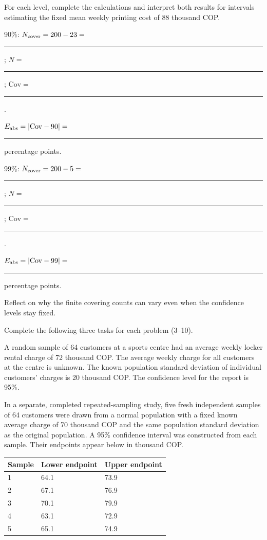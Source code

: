 \par For each level, complete the calculations and interpret both results for intervals estimating the fixed mean weekly printing cost of 88 thousand COP.
\par 90\%: $N_{\rm cover}=200-23=$ \rule{.5in}{.3pt}; $N=$ \rule{.4in}{.3pt}; $\mathrm{Cov}=$ \rule{1in}{.3pt}.
\par $E_{\rm abs}=|\mathrm{Cov}-90|=$ \rule{.7in}{.3pt} percentage points. 
\par 99\%: $N_{\rm cover}=200-5=$ \rule{.5in}{.3pt}; $N=$ \rule{.4in}{.3pt}; $\mathrm{Cov}=$ \rule{1in}{.3pt}.
\par $E_{\rm abs}=|\mathrm{Cov}-99|=$ \rule{.7in}{.3pt} percentage points. 
\par Reflect on why the finite covering counts can vary even when the confidence levels stay fixed.


Complete the following three tasks for each problem (3--10).


\noindent\begin{minipage}[t]{0.60\linewidth}
\vspace{0pt}
A random sample of 64 customers at a sports centre had an average weekly locker rental charge of 72 thousand COP. The average weekly charge for all customers at the centre is unknown. The known population standard deviation of individual customers' charges is 20 thousand COP. The confidence level for the report is 95\%.

In a separate, completed repeated-sampling study, five fresh independent samples of 64 customers were drawn from a normal population with a fixed known average charge of 70 thousand COP and the same population standard deviation as the original population. A 95\% confidence interval was constructed from each sample. Their endpoints appear below in thousand COP.
\end{minipage}\hfill
\begin{minipage}[t]{0.38\linewidth}
\vspace{0pt}
\centering
\small
\setlength{\tabcolsep}{4pt}
\begin{tabular}{@{}lll@{}}\toprule
Sample & Lower endpoint & Upper endpoint\\\midrule
1 & 64.1 & 73.9\\
2 & 67.1 & 76.9\\
3 & 70.1 & 79.9\\
4 & 63.1 & 72.9\\
5 & 65.1 & 74.9\\
\bottomrule\end{tabular}
\end{minipage}\par

